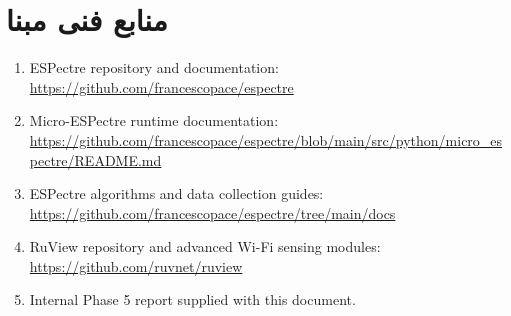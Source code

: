 \documentclass[12pt,a4paper]{article}
\begin{document}
\section*{منابع فنی مبنا}

\begin{latin}
\begin{enumerate}
  \item ESPectre repository and documentation: \url{https://github.com/francescopace/espectre}
  \item Micro-ESPectre runtime documentation: \url{https://github.com/francescopace/espectre/blob/main/src/python/micro_espectre/README.md}
  \item ESPectre algorithms and data collection guides: \url{https://github.com/francescopace/espectre/tree/main/docs}
  \item RuView repository and advanced Wi-Fi sensing modules: \url{https://github.com/ruvnet/ruview}
  \item Internal Phase 5 report supplied with this document.
\end{enumerate}
\end{latin}
\end{document}
